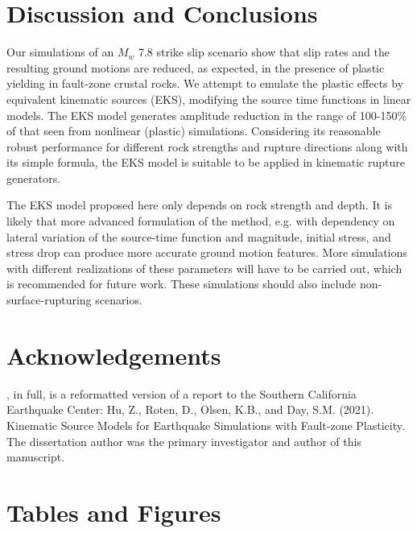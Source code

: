 \section{Discussion and Conclusions}\label{eks:conclusions}
Our simulations of an $M_w$ 7.8 strike slip scenario show that slip rates and the resulting ground motions are reduced, as expected, in the presence of plastic yielding in fault-zone crustal rocks. We attempt to emulate the plastic effects by equivalent kinematic sources (EKS), modifying the source time functions in linear models. The EKS model generates amplitude reduction in the range of 100-150\% of that seen from nonlinear (plastic) simulations.
Considering its reasonable robust performance for different rock strengths and rupture directions along with its simple formula, the EKS model is suitable to be applied in kinematic rupture generators.

The EKS model proposed here only depends on rock strength and depth. It is likely that more advanced formulation of the method, e.g. with dependency on lateral variation of the source-time function and magnitude, initial stress, and stress drop can produce more accurate ground motion features. 
More simulations with different realizations of these parameters will have to be carried out, which is recommended for future work. These simulations should also include non-surface-rupturing scenarios.

\section*{Acknowledgements}

, in full, is a reformatted version of a report to the Southern California Earthquake Center: Hu, Z., Roten, D., Olsen, K.B., and Day, S.M. (2021). Kinematic Source Models for Earthquake Simulations with Fault-zone Plasticity. The dissertation author was the primary investigator and author of this manuscript.


\newpage
\section*{Tables and Figures}
%




